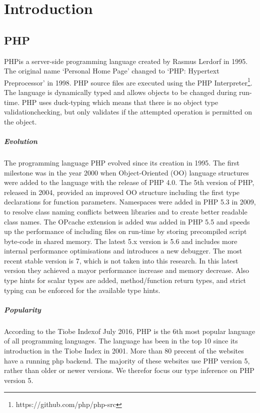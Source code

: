 \documentclass[../main.tex]{subfiles}
\begin{document}
    \chapter{Introduction}\label{ch:introduction}

    \section{PHP}
        PHP\footnotemark is a server-side programming language created by Rasmus Lerdorf in 1995.
        The original name `Personal Home Page' changed to `PHP: Hypertext Preprocessor' in 1998.
        PHP source files are executed using the PHP Interpreter\footnote{https://github.com/php/php-src}. 
        The language is dynamically typed and allows objects to be changed during run-time.
        PHP uses duck-typing which means that there is no object type validationchecking, but only validates if the attempted operation is permitted on the object.
        
        \paragraph{Evolution}
        The programming language PHP evolved since its creation in 1995.
        The first milestone was in the year 2000 when Object-Oriented (OO) language structures were added to the language with the release of PHP 4.0.
        The 5th version of PHP, released in 2004, provided an improved OO structure  including the first type declarations for function parameters.
        Namespaces were added in PHP 5.3 in 2009, to resolve class naming conflicts between libraries and to create better readable class names.
        The OPcache extension is added was added in PHP 5.5 and speeds up the performance of including files on run-time by storing precompiled script byte-code in shared memory.
        The latest 5.x version is 5.6 and includes more internal performance optimisations and introduces a new debugger.
        The most recent stable version is 7, which is not taken into this research.
        In this latest version they achieved a mayor performance increase and memory decrease.
        Also type hints for scalar types are added, method/function return types, and strict typing can be enforced for the available type hints.
       
        \paragraph{Popularity}
        According to the Tiobe Index\footnotemark of July 2016, PHP is the 6th most popular language of all programming languages.
        The language has been in the top 10 since its introduction in the Tiobe Index in 2001.
        More than 80 precent of the websites have a running php backend\footnotemark.
        The majority of these websites use PHP version 5, rather than older or newer versions.
        We therefor focus our type inference on PHP version 5.
\end{document}
